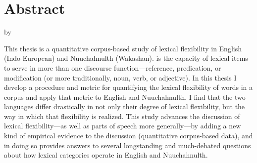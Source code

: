 \clearpage
{}
\section*{Abstract}
\label{sec:abstract}

\begin{center}

  \doctitle

  by

  \theauthor

\end{center}

This thesis is a quantitative corpus-based study of lexical flexibility in English (Indo-European) and Nuuchahnulth (Wakashan).  is the capacity of lexical items to serve in more than one discourse function---reference, predication, or modification (or more traditionally, noun, verb, or adjective). In this thesis I develop a procedure and metric for quantifying the lexical flexibility of words in a corpus and apply that metric to English and Nuuchahnulth. I find that the two languages differ drastically in not only their degree of lexical flexibility, but the way in which that flexibility is realized. This study advances the discussion of lexical flexibility---as well as parts of speech more generally---by adding a new kind of empirical evidence to the discussion (quantitative corpus-based data), and in doing so provides answers to several longstanding and much-debated questions about how lexical categories operate in English and Nuuchahnulth.

